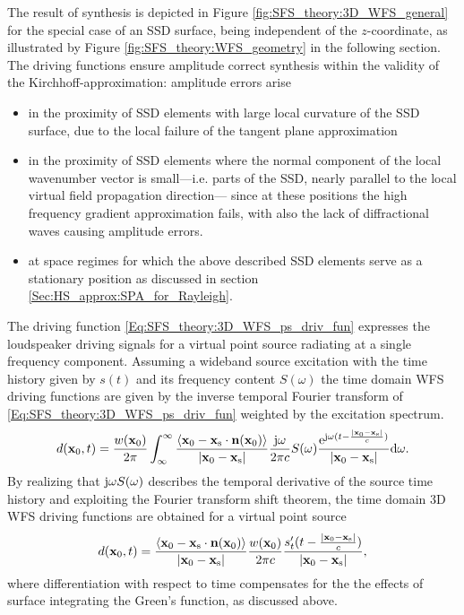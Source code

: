 The result of synthesis is depicted in Figure \ref{fig:SFS_theory:3D_WFS_general} for the special case of an SSD surface, being independent of the $z$-coordinate, as illustrated by Figure \ref{fig:SFS_theory:WFS_geometry} in the following section.
The driving functions ensure amplitude correct synthesis within the validity of the Kirchhoff-approximation:
amplitude errors arise 
\begin{itemize}
\item in the proximity of SSD elements with large local curvature of the SSD surface, due to the local failure of the tangent plane approximation
\item in the proximity of SSD elements where the normal component of the local wavenumber vector is small---i.e. parts of the SSD, nearly parallel to the local virtual field propagation direction--- since at these positions the high frequency gradient approximation fails, with also the lack of diffractional waves causing amplitude errors.
\item at space regimes for which the above described SSD elements serve as a stationary position as discussed in section \ref{Sec:HS_approx:SPA_for_Rayleigh}.
\end{itemize}

The driving function \eqref{Eq:SFS_theory:3D_WFS_ps_driv_fun} expresses the loudspeaker driving signals for a virtual point source radiating at a single frequency component.
Assuming a wideband source excitation with the time history given by $s(t)$ and its frequency content $S(\omega)$ the time domain WFS driving functions are given by the inverse temporal Fourier transform of \eqref{Eq:SFS_theory:3D_WFS_ps_driv_fun} weighted by the excitation spectrum.
\begin{equation}
d(\mathbf{x}_0,t) = \frac{w(\mathbf{x}_0)}{2\pi} \int_{\infty}^{\infty} \frac{\left< \mathbf{x}_0-\mathbf{x}_{\mathrm{s}} \cdot \mathbf{n}(\mathbf{x}_0) \right> }{|\mathbf{x}_0-\mathbf{x}_{\mathrm{s}}|} \frac{\mathrm{j} \omega }{2\pi c} S(\omega) \frac{\mathrm{e}^{ \mathrm{j} \omega ( t - \frac{|\mathbf{x}_0-\mathbf{x}_{\mathrm{s}}|}{c} ) }}{|\mathbf{x}_0-\mathbf{x}_{\mathrm{s}}|} 
\mathrm{d} \omega.
\end{equation}
By realizing that $\mathrm{j} \omega S(\omega)$ describes the temporal derivative of the source time history and exploiting the Fourier transform shift theorem, the time domain 3D WFS driving functions are obtained for a virtual point source
\begin{equation}
d(\mathbf{x}_0,t) = \frac{\left< \mathbf{x}_0-\mathbf{x}_{\mathrm{s}} \cdot \mathbf{n}(\mathbf{x}_0) \right> }{|\mathbf{x}_0-\mathbf{x}_{\mathrm{s}}|} \frac{w(\mathbf{x}_0)}{2\pi c} \frac{s'_t(t - \frac{|\mathbf{x}_0-\mathbf{x}_{\mathrm{s}}|}{c} )}{|\mathbf{x}_0-\mathbf{x}_{\mathrm{s}}|},
\end{equation}
where differentiation with respect to time compensates for the the effects of surface integrating the Green's function, as discussed above.

